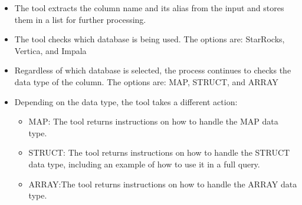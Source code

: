     \begin{itemize}
        \item  The tool extracts the column name and its alias from the input and stores them in a list for further processing.
        \item  The tool checks which database is being used. The options are: StarRocks, Vertica, and Impala
        \item  Regardless of which database is selected, the process continues to checks the data type of the column. The options are: MAP, STRUCT, and ARRAY
        \item  Depending on the data type, the tool takes a different action:
        \begin{itemize}
            \item MAP: The tool returns instructions on how to handle the MAP data type.
            \item STRUCT: The tool returns instructions on how to handle the STRUCT data type, including an example of how to use it in a full query.
            \item ARRAY:The tool returns instructions on how to handle the ARRAY data type.
        \end{itemize}
    \end{itemize}

